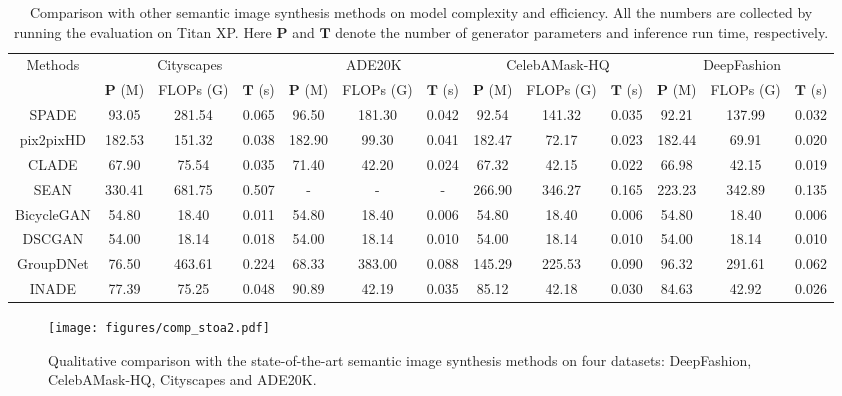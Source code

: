 \documentclass[final]{cvpr}
\begin{document}
\begin{table*}[t]
\setlength{\tabcolsep}{1.8mm}
    \centering
    \caption{Comparison with other semantic image synthesis methods on model complexity and efficiency. All the numbers are collected by running the evaluation on Titan XP. Here $\mathbf{P}$ and $\mathbf{T}$ denote the number of generator parameters and inference run time, respectively.}
\footnotesize
    \begin{tabular}{c|c|c|c|c|c|c|c|c|c|c|c|c}
    \hline
        \multirow{2}{*}{Methods} & \multicolumn{3}{c|}{Cityscapes} & \multicolumn{3}{c|}{ADE20K} & \multicolumn{3}{c|}{CelebAMask-HQ} & \multicolumn{3}{c}{DeepFashion}\\
        \cline{2-13}
         & $\mathbf{P}$ (M) & FLOPs (G) & $\mathbf{T}$ (s) & $\mathbf{P}$ (M) & FLOPs (G) & $\mathbf{T}$ (s) & $\mathbf{P}$ (M) & FLOPs (G) & $\mathbf{T}$ (s) & $\mathbf{P}$ (M) & FLOPs (G) & $\mathbf{T}$ (s)\\
        \hline
        SPADE & 93.05 & 281.54 & 0.065 & 96.50 & 181.30 & 0.042 & 92.54 & 141.32 & 0.035 & 92.21 & 137.99 & 0.032\\
        \hline
        pix2pixHD & 182.53 & 151.32 & 0.038 & 182.90 & 99.30 & 0.041 & 182.47 & 72.17 & 0.023 & 182.44 & 69.91 & 0.020\\
        \hline
        CLADE & 67.90 & 75.54 & 0.035 & 71.40 & 42.20 & 0.024 & 67.32 & 42.15 & 0.022 & 66.98 & 42.15 & 0.019\\
        \hline
        SEAN & 330.41 & 681.75 & 0.507 & - & - & - & 266.90 & 346.27 & 0.165 & 223.23 & 342.89 & 0.135\\
        \hline
        BicycleGAN & 54.80 & 18.40 & 0.011 & 54.80 & 18.40 & 0.006 & 54.80 & 18.40 & 0.006 & 54.80 & 18.40 & 0.006\\
        \hline
        DSCGAN & 54.00 & 18.14 & 0.018 & 54.00 & 18.14 & 0.010 & 54.00 & 18.14 & 0.010 & 54.00 & 18.14 & 0.010\\
        \hline
        GroupDNet & 76.50 & 463.61 & 0.224 & 68.33 & 383.00 & 0.088 & 145.29 & 225.53 & 0.090 & 96.32 & 291.61 & 0.062\\
        \hline
        INADE & 77.39 & 75.25 & 0.048 & 90.89 & 42.19 & 0.035 & 85.12 & 42.18 & 0.030 & 84.63 & 42.92 & 0.026\\
        \hline
    \end{tabular}
    \label{tab:comp_complexity}
\end{table*}{}

\begin{figure}[tp]
  \centering
  \texttt{[image: figures/comp\_stoa2.pdf]}
  \caption{Qualitative comparison with the state-of-the-art semantic image synthesis methods on four datasets: DeepFashion, CelebAMask-HQ, Cityscapes and ADE20K.}
  \label{fig:results_stoa}
\end{figure}
\end{document}
